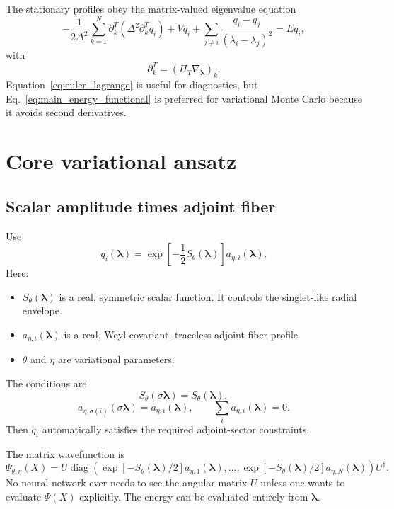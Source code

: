 \documentclass[11pt]{article}
\newcommand{\diag}{\operatorname{diag}}
\newcommand{\projT}{\Pi_T}
\begin{document}
The stationary profiles obey the matrix-valued eigenvalue equation
\begin{equation}
\boxed{
-\frac1{2\Delta^2}\sum_{k=1}^N\partial^T_k
\left(\Delta^2\partial^T_k q_i\right)
+Vq_i
+\sum_{j\ne i}\frac{q_i-q_j}{(\lambda_i-\lambda_j)^2}
=Eq_i,
}
\label{eq:euler_lagrange}
\end{equation}
with
\begin{equation}
\partial^T_k=(\projT\nabla_{\bm\lambda})_k.
\end{equation}
Equation~\eqref{eq:euler_lagrange} is useful for diagnostics, but Eq.~\eqref{eq:main_energy_functional} is preferred for variational Monte Carlo because it avoids second derivatives.

\section{Core variational ansatz}

\subsection{Scalar amplitude times adjoint fiber}

Use
\begin{equation}
\boxed{
q_i(\bm\lambda)=\exp\!\left[-\frac12S_\theta(\bm\lambda)\right]a_{\eta,i}(\bm\lambda).
}
\label{eq:q_expS_a}
\end{equation}
Here:
\begin{itemize}
\item $S_\theta(\bm\lambda)$ is a real, symmetric scalar function.  It controls the singlet-like radial envelope.
\item $a_{\eta,i}(\bm\lambda)$ is a real, Weyl-covariant, traceless adjoint fiber profile.
\item $\theta$ and $\eta$ are variational parameters.
\end{itemize}
The conditions are
\begin{equation}
S_\theta(\sigma\bm\lambda)=S_\theta(\bm\lambda),
\end{equation}
\begin{equation}
a_{\eta,\sigma(i)}(\sigma\bm\lambda)=a_{\eta,i}(\bm\lambda),
\qquad
\sum_i a_{\eta,i}(\bm\lambda)=0.
\end{equation}
Then $q_i$ automatically satisfies the required adjoint-sector constraints.

The matrix wavefunction is
\begin{equation}
\boxed{
\Psi_{\theta,\eta}(X)
=U\diag\!\left(
\exp[-S_\theta(\bm\lambda)/2]a_{\eta,1}(\bm\lambda),
\ldots,
\exp[-S_\theta(\bm\lambda)/2]a_{\eta,N}(\bm\lambda)
\right)U^\dagger.
}
\label{eq:matrix_wavefunction_spectral}
\end{equation}
No neural network ever needs to see the angular matrix $U$ unless one wants to evaluate $\Psi(X)$ explicitly.  The energy can be evaluated entirely from $\bm\lambda$.
\end{document}
